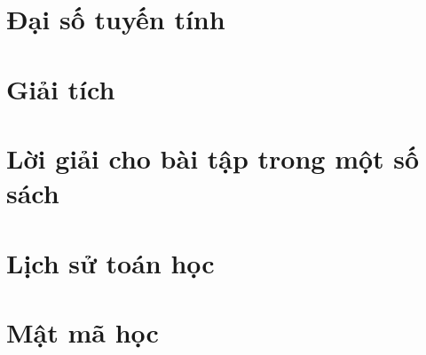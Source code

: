 \documentclass[oneside]{book}
\begin{document}
\part{Đại số tuyến tính}



\part{Giải tích}




\part{Lời giải cho bài tập trong một số sách}



\part{Lịch sử toán học}


\part{Mật mã học}





\medskip


\end{document}
